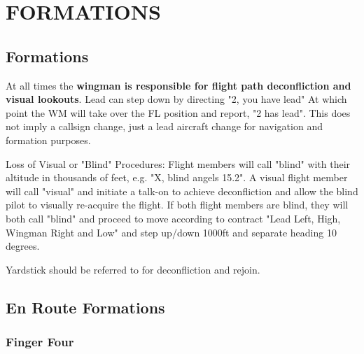 \section{FORMATIONS}

\subsection{Formations}

At all times the \textbf{wingman is responsible for flight path deconfliction
and visual lookouts}.  Lead can step down by directing "2, you have lead" At
which point the WM will take over the FL position and report, "2 has lead". This
does not imply a callsign change, just a lead aircraft change for navigation and
formation purposes.

Loss of Visual or "Blind" Procedures: Flight members will call "blind" with
their altitude in thousands of feet, e.g. "X, blind angels 15.2". A visual
flight member will call "visual" and initiate a talk-on to achieve
deconfliction and allow the blind pilot to visually re-acquire the flight. If
both flight members are blind, they will both call "blind" and proceed to move
according to contract "Lead Left, High, Wingman Right and Low" and step up/down
1000ft and separate heading 10 degrees.

Yardstick should be referred to for deconfliction and rejoin.

\subsection{En Route Formations}


\subsubsection{Finger Four}

